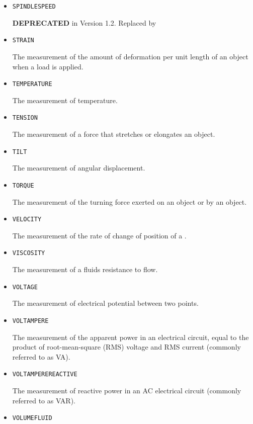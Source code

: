\begin{itemize}
\item \texttt{SPINDLE\textunderscore SPEED}  

\textbf{DEPRECATED} in Version 1.2.  Replaced by 


\item \texttt{STRAIN}  

The measurement of the amount of deformation per unit length of an object when a load is applied.


\item \texttt{TEMPERATURE}  

The measurement of temperature.


\item \texttt{TENSION}  

The measurement of a force that stretches or elongates an object.


\item \texttt{TILT}  

The measurement of angular displacement.


\item \texttt{TORQUE}  

The measurement of the turning force exerted on an object or by an object.


\item \texttt{VELOCITY}  

The measurement of the rate of change of position of a .


\item \texttt{VISCOSITY}  

The measurement of a fluids resistance to flow.


\item \texttt{VOLTAGE}  

The measurement of electrical potential between two points.


\item \texttt{VOLT\textunderscore AMPERE}  

The measurement of the apparent power in an electrical circuit, equal to the product of root-mean-square (RMS) voltage and RMS current (commonly referred to as VA).


\item \texttt{VOLT\textunderscore AMPERE\textunderscore REACTIVE}  

The measurement of reactive power in an AC electrical circuit (commonly referred to as VAR).


\item \texttt{VOLUME\textunderscore FLUID}  


\end{itemize}
